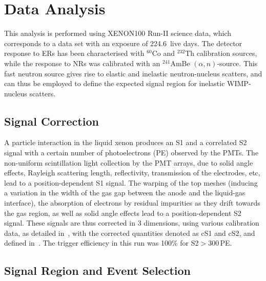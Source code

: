\section{Data Analysis}
\label{sec:analysis}

This analysis is performed using XENON100 Run-II science data, which corresponds to a data set with an exposure of 224.6~live days. The detector response to
ERs has been characterised with $^{60}$Co and $^{232}$Th calibration sources, while the response to NRs was calibrated with an $^{241}$AmBe $(\alpha,n)$-source. This fast neutron source gives rise to elastic and inelastic neutron-nucleus scatters, and can thus be employed to define the expected signal region for inelastic WIMP-nucleus scatters.

\subsection{Signal Correction} 

A particle interaction in the liquid xenon produces an S1 and a correlated S2 signal with a certain number of photoelectrons (PE) observed by the PMTs. The non-uniform scintillation light collection by the PMT arrays, due to solid angle effects, Rayleigh scattering length, reflectivity, transmission of the electrodes, etc, lead to a position-dependent S1 signal. The warping of the top meshes (inducing a variation in the width of the gas gap between the anode and the liquid-gas interface), the absorption of electrons by residual impurities as they drift towards the gas region, as well as solid angle effects lead to a position-dependent S2 signal. These signals are thus corrected in 3 dimensions, using various calibration data, as detailed in~\cite{Aprile:2011dd,Aprile:2012vw}, with the corrected quantities denoted as cS1 and cS2, and defined in~\cite{Aprile:2012vw}. The trigger efficiency in this run was 100\% for S2$>$300\,PE.

\subsection{Signal Region and Event Selection} 

